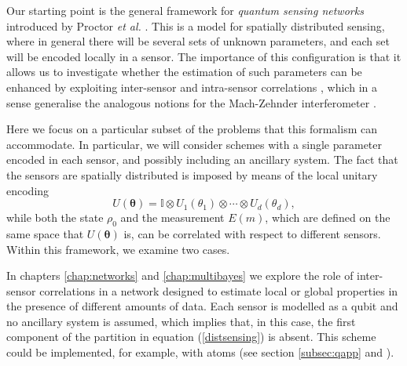 Our starting point is the general framework for \emph{quantum sensing networks} introduced by Proctor \emph{et al.} \cite{proctor2017networked}. This is a model for spatially distributed sensing, where in general there will be several sets of unknown parameters, and each set will be encoded locally in a sensor. The importance of this configuration is that it allows us to investigate whether the estimation of such parameters can be enhanced by exploiting inter-sensor and intra-sensor correlations \cite{proctor2017networked, proctor2017networkedshort, sammy2016compatibility, eldredge2018, ge2018}, which in a sense generalise the analogous notions for the Mach-Zehnder interferometer \cite{proctor2017networked, knott2016local}. 

Here we focus on a particular subset of the problems that this formalism can accommodate. In particular, we will consider schemes with a single parameter encoded in each sensor, and possibly including an ancillary system. The fact that the sensors are spatially distributed is imposed by means of the local unitary encoding
\begin{equation}
U(\boldsymbol{\theta}) = \mathbb{I}\otimes U_1(\theta_1)\otimes \cdots \otimes U_d(\theta_d),
\label{distsensing}
\end{equation}
while both the state $\rho_0$ and the measurement $E(m)$, which are defined on the same space that $U(\boldsymbol{\theta})$ is, can be correlated with respect to different sensors. Within this framework, we examine two cases. 

In chapters \ref{chap:networks} and \ref{chap:multibayes} we explore the role of inter-sensor correlations in a network designed to estimate local or global properties in the presence of different amounts of data. Each sensor is modelled as a qubit and no ancillary system is assumed, which implies that, in this case, the first component of the partition in equation (\ref{distsensing}) is absent. This scheme could be implemented, for example, with atoms (see section \ref{subsec:qapp} and \cite{proctor2017networked}).

